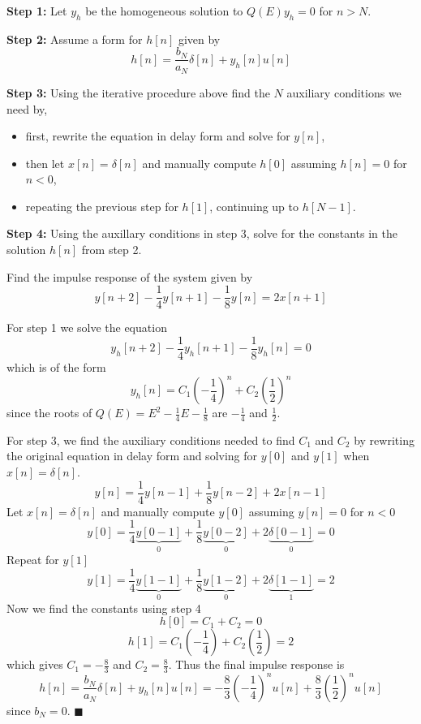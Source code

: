 \textbf{Step 1:} Let $y_h$ be the homogeneous solution to $Q(E)y_h=0$ for $n > N$.

\textbf{Step 2:} Assume a form for $h[n]$ given by
\[
h[n] = \frac{b_N}{a_N}\delta[n] + y_h[n]u[n]
\]

\textbf{Step 3:} Using the iterative procedure above find the $N$ auxiliary conditions we need by,

\begin{itemize}
\item first, rewrite the equation in delay form and solve for $y[n]$,
\item then let $x[n] = \delta[n]$ and manually compute $h[0]$ assuming $h[n] = 0$ for $n < 0$,
\item repeating the previous step for $h[1]$, continuing up to $h[N-1]$.
\end{itemize}

\textbf{Step 4:} Using the auxillary conditions in step 3, solve for the constants in the solution $h[n]$ from step 2.

\begin{example}

  Find the impulse response of the system given by
  \[
  y[n+2] -\frac{1}{4}y[n+1] -\frac{1}{8}y[n]= 2x[n+1]
  \]

  For step 1 we solve the equation
  \[
  y_h[n+2] -\frac{1}{4}y_h[n+1] -\frac{1}{8}y_h[n] = 0
  \]
  which is of the form
  \[
  y_h[n] = C_1 \left( -\frac{1}{4}\right)^n + C_2 \left( \frac{1}{2}\right)^n
  \]
  since the roots of $Q(E) = E^2 - \frac{1}{4}E - \frac{1}{8}$ are $-\frac{1}{4}$ and $\frac{1}{2}$.

  For step 3, we find the auxiliary conditions needed to find $C_1$ and $C_2$ by rewriting the original equation in delay form and solving for $y[0]$ and $y[1]$ when $x[n] = \delta[n]$.
  \[
  y[n] = \frac{1}{4}y[n-1] + \frac{1}{8}y[n-2] + 2x[n-1]
  \]    
  Let $x[n] = \delta[n]$ and manually compute $y[0]$ assuming $y[n] = 0$ for $n < 0$
  \[
  y[0] = \frac{1}{4}\underbrace{y[0-1]}_{0} + \frac{1}{8}\underbrace{y[0-2]}_{0} + 2\underbrace{\delta[0-1]}_{0} = 0
  \]
  Repeat for $y[1]$
  \[
  y[1] = \frac{1}{4}\underbrace{y[1-1]}_{0} + \frac{1}{8}\underbrace{y[1-2]}_{0} + 2\underbrace{\delta[1-1]}_{1} = 2
  \]  
  Now we find the constants using step 4
  \[
  h[0] = C_1  + C_2  = 0
  \]
  \[
  h[1] = C_1 \left( -\frac{1}{4}\right) + C_2 \left( \frac{1}{2}\right) = 2
  \]
  which gives $C_1 = -\frac{8}{3}$ and $C_2 = \frac{8}{3}$. Thus the final impulse response is
  \[
  h[n] = \frac{b_N}{a_N}\delta[n] + y_h[n]u[n] = -\frac{8}{3}\left( -\frac{1}{4}\right)^nu[n] + \frac{8}{3}\left( \frac{1}{2}\right)^n u[n]
  \]
  since $b_N = 0$.
$\blacksquare$
\end{example}

